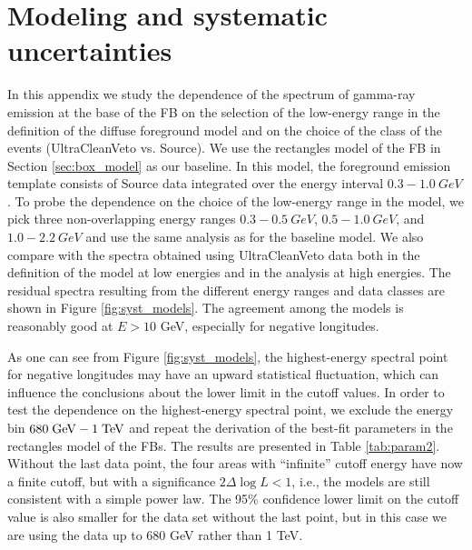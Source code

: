 \section{Modeling and systematic uncertainties}

In this appendix we study the dependence of the spectrum of gamma-ray emission at the base of the FB
on the selection of the low-energy range in the definition of the diffuse foreground model
and on the choice of the class of the events (UltraCleanVeto vs. Source).
We use the rectangles model of the FB in Section \ref{sec:box_model}
as our baseline.
In this model, the foreground emission template consists of Source data integrated over the energy interval $0.3 - \SI{1.0}{GeV}$. 
To probe the dependence on the choice of the low-energy range in the model, 
we pick three non-overlapping energy ranges $0.3 - \SI{0.5}{GeV}$, $0.5 - \SI{1.0}{GeV}$, and $1.0 - \SI{2.2}{GeV}$ 
and use the same analysis as for the baseline model. 
We also compare with the spectra obtained using UltraCleanVeto data both in the definition of the model
at low energies and in the analysis at high energies.
The residual spectra resulting from the different energy ranges and data classes are shown in Figure \ref{fig:syst_models}. 
The agreement among the models is reasonably good at $E > 10$ GeV, especially for negative longitudes.

As one can see from Figure \ref{fig:syst_models}, 
the highest-energy spectral point for negative longitudes may have an upward statistical fluctuation,
which can influence the conclusions about the lower limit in the cutoff values.
In order to test the dependence on the highest-energy spectral point, we exclude the energy bin $680\;{\rm GeV} - 1\;{\rm TeV}$ and 
repeat the derivation of the best-fit parameters in the rectangles model of the FBs.
The results are presented in Table \ref{tab:param2}.
Without the last data point, the four areas with ``infinite'' cutoff energy have now a finite cutoff,
but with a significance $2\Delta \log L  < 1$, i.e., the models are still consistent with a simple power law.
The 95\% confidence lower limit on the cutoff value is also smaller for the data set without the last point,
but in this case we are using the data up to 680 GeV rather than 1 TeV.


